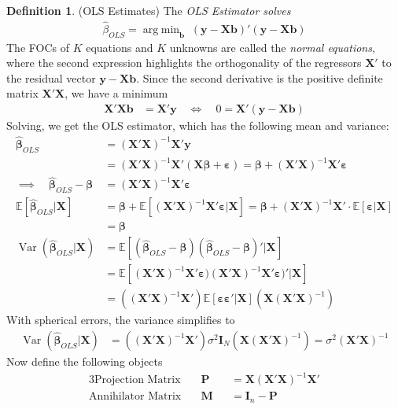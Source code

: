 \documentclass[12pt]{article}
\theoremstyle{plain}
\theoremstyle{definition}
\newtheorem{defn}[thm]{Definition}
\theoremstyle{remark}
\newcommand{\bsP}{\boldsymbol{P}}
\newcommand{\bsM}{\boldsymbol{M}}
\newcommand{\bsb}{\boldsymbol{b}}
\newcommand{\bsI}{\boldsymbol{I}}
\newcommand{\bsX}{\boldsymbol{X}}
\newcommand{\bsy}{\boldsymbol{y}}
\newcommand{\bsvarepsilon}{\boldsymbol{\varepsilon}}
\newcommand{\bsbeta}{\boldsymbol{\beta}}
\newcommand{\E}{\mathbb{E}}
\DeclareMathOperator*{\argmin}{arg\;min}
\newcommand{\Var}{\operatorname{Var}}
\begin{document}
\begin{defn}(OLS Estimates)
The \emph{OLS Estimator solves}
\begin{align*}
  \hat{\beta}_{OLS}
  =
  \argmin_{\bsb} \;
  (\bsy - \bsX \bsb)'(\bsy - \bsX \bsb)
\end{align*}
The FOCs of $K$ equations and $K$ unknowns are called the
\emph{normal equations}, where the second expression highlights the
orthogonality of the regressors $\bsX'$ to the residual vector
$\bsy-\bsX\bsb$.  Since the second derivative is the positive definite
matrix $\bsX'\bsX$, we have a minimum
\begin{align*}
  \bsX'\bsX\bsb &= \bsX'\bsy
  \quad\iff\quad
  0= \bsX'(\bsy-\bsX\bsb)
\end{align*}
Solving, we get the OLS estimator, which has the following mean and
variance:
\begin{align*}
  \hat{\bsbeta}_{OLS}
  &= (\bsX'\bsX)^{-1}\bsX'\bsy \\
  &= (\bsX'\bsX)^{-1}\bsX' (\bsX \bsbeta + \bsvarepsilon)
  = \bsbeta + (\bsX'\bsX)^{-1}\bsX' \bsvarepsilon
  \\
  \implies\quad
  \hat{\bsbeta}_{OLS} - \bsbeta
  &= (\bsX'\bsX)^{-1}\bsX' \bsvarepsilon \\
  \E[\hat{\bsbeta}_{OLS}|\bsX]
  &=
  \bsbeta +
  \E[(\bsX'\bsX)^{-1}\bsX' \bsvarepsilon |\bsX]
  =
  \bsbeta +
  (\bsX'\bsX)^{-1}\bsX' \cdot \E[\bsvarepsilon |\bsX]
  \\
  &= \bsbeta \\
  \Var(\hat{\bsbeta}_{OLS}|\bsX)
  &=
  \E[(\hat{\bsbeta}_{OLS}-\bsbeta)(\hat{\bsbeta}_{OLS}-\bsbeta)'|\bsX]
  \\
  &=
  \E\left[
    (\bsX'\bsX)^{-1}\bsX'\bsvarepsilon)
    (\bsX'\bsX)^{-1}\bsX'\bsvarepsilon)'
  |\bsX\right]
  \\
  &=
  \left((\bsX'\bsX)^{-1}\bsX'\right)
  \E[\bsvarepsilon\bsvarepsilon' |\bsX]
  \left(\bsX(\bsX'\bsX)^{-1}\right)
\end{align*}
With spherical errors, the variance simplifies to
\begin{align*}
  \Var(\hat{\bsbeta}_{OLS}|\bsX)
  &=
  \left((\bsX'\bsX)^{-1}\bsX'\right)
  \sigma^2 \bsI_N
  \left(\bsX(\bsX'\bsX)^{-1}\right)
  =\sigma^2 (\bsX'\bsX)^{-1}
\end{align*}
Now define the following objects
\begin{alignat*}{3}
  \text{Projection Matrix}&\quad
  \bsP &&= \bsX(\bsX'\bsX)^{-1}\bsX' \\
  \text{Annihilator Matrix}&\quad
  \bsM &&= \bsI_n - \bsP \\

\end{alignat*}
\end{defn}
\end{document}
